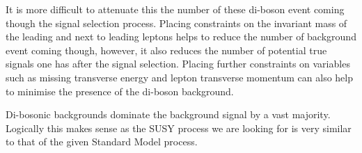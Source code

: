 \noindent It is more difficult to attenuate this the number of these di-boson event coming though the signal selection process.
Placing constraints on the invariant mass  of the leading and next to leading leptons helps to reduce the number of background event coming though, however, it also reduces the number of potential true signals one has after the signal selection.
Placing further constraints on variables such as missing transverse energy and lepton transverse momentum can also help to minimise the presence of the di-boson background.

Di-bosonic backgrounds dominate the background signal by a vast majority.
Logically this makes sense as the SUSY process we are looking for is very similar to that of the given Standard Model process. 
